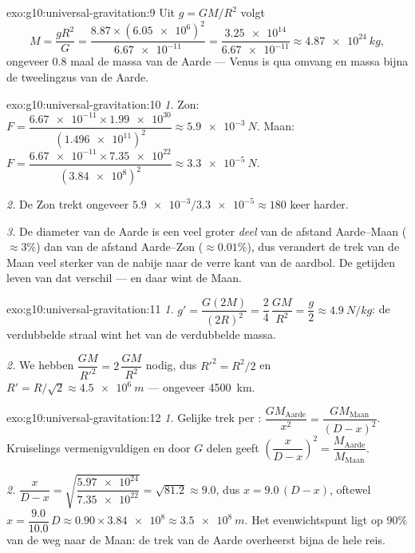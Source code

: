 \begin{solution}{exo:g10:universal-gravitation:9}
Uit $g = GM/R^2$ volgt
\[
M = \frac{g R^2}{G}
= \frac{8.87 \times (\num{6.05e6})^2}{\num{6.67e-11}}
= \frac{\num{3.25e14}}{\num{6.67e-11}}
\approx \qty{4.87e24}{kg},
\]
ongeveer $0.8$ maal de massa van de Aarde --- Venus is qua omvang en
massa bijna de tweelingzus van de Aarde.
\end{solution}

\begin{solution}{exo:g10:universal-gravitation:10}
\emph{1.} Zon:
$F = \dfrac{\num{6.67e-11} \times \num{1.99e30}}{(\num{1.496e11})^2}
\approx \qty{5.9e-3}{N}$. Maan:
$F = \dfrac{\num{6.67e-11} \times \num{7.35e22}}{(\num{3.84e8})^2}
\approx \qty{3.3e-5}{N}$.

\emph{2.} De Zon trekt ongeveer
$\num{5.9e-3}/\num{3.3e-5} \approx 180$ keer harder.

\emph{3.} De diameter van de Aarde is een veel groter \emph{deel} van de
afstand Aarde--Maan ($\approx 3\%$) dan van de afstand Aarde--Zon
($\approx 0.01\%$), dus verandert de trek van de Maan veel sterker van
de nabije naar de verre kant van de aardbol. De getijden leven van dat
verschil --- en daar wint de Maan.
\end{solution}

\begin{solution}{exo:g10:universal-gravitation:11}
\emph{1.} $g' = \dfrac{G (2M)}{(2R)^2} = \dfrac{2}{4}\,\dfrac{GM}{R^2}
= \dfrac{g}{2} \approx \qty{4.9}{N/kg}$: de verdubbelde straal wint het
van de verdubbelde massa.

\emph{2.} We hebben $\dfrac{GM}{R'^2} = 2\,\dfrac{GM}{R^2}$ nodig, dus
$R'^2 = R^2/2$ en $R' = R/\sqrt{2} \approx \qty{4.5e6}{m}$ --- ongeveer
\qty{4500}{km}.
\end{solution}

\begin{solution}{exo:g10:universal-gravitation:12}
\emph{1.} Gelijke trek per :
$\dfrac{G M_{\text{Aarde}}}{x^2} = \dfrac{G M_{\text{Maan}}}{(D-x)^2}$.
Kruiselings vermenigvuldigen en door $G$ delen geeft
$\left(\dfrac{x}{D-x}\right)^2 = \dfrac{M_{\text{Aarde}}}{M_{\text{Maan}}}$.

\emph{2.} $\dfrac{x}{D-x}
= \sqrt{\dfrac{\num{5.97e24}}{\num{7.35e22}}} = \sqrt{81.2} \approx
9.0$, dus $x = 9.0\,(D - x)$, oftewel $x = \dfrac{9.0}{10.0}\,D
\approx 0.90 \times \num{3.84e8} \approx \qty{3.5e8}{m}$. Het
evenwichtspunt ligt op $90\%$ van de weg naar de Maan: de trek van de
Aarde overheerst bijna de hele reis.
\end{solution}

